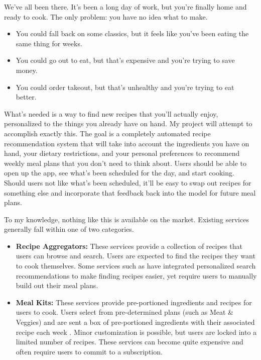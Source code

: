 \documentclass{./styles/ucsdreport}
\begin{document}
We've all been there. It's been a long day of work, but you're finally home and ready to cook. The only problem: you have no idea what to make.

\begin{itemize}
    \item You could fall back on some classics, but it feels like you've been eating the same thing for weeks.
    \item You could go out to eat, but that's expensive and you're trying to save money.
    \item You could order takeout, but that's unhealthy and you're trying to eat better.
\end{itemize}

What's needed is a way to find new recipes that you'll actually enjoy, personalized to the things you already have on hand. My project will attempt to accomplish exactly this. The goal is a completely automated recipe recommendation system that will take into account the ingredients you have on hand, your dietary restrictions, and your personal preferences to recommend weekly meal plans that you don't need to think about. Users should be able to open up the app, see what's been scheduled for the day, and start cooking. Should users not like what's been scheduled, it'll be easy to swap out recipes for something else and incorporate that feedback back into the model for future meal plans.

To my knowledge, nothing like this is available on the market. Existing services generally fall within one of two categories.

\begin{itemize}

    \item \textbf{Recipe Aggregators:} These services provide a collection of recipes that users can browse and search. Users are expected to find the recipes they want to cook themselves. Some services such as \citet{yummly} have integrated personalized search recommendations to make finding recipes easier, yet require users to manually build out their meal plans.

    \item \textbf{Meal Kits:} These services provide pre-portioned ingredients and recipes for users to cook. Users select from pre-determined plans (such as Meat \& Veggies) and are sent a box of pre-portioned ingredients with their associated recipe each week \citep{hellofresh}. Minor customization is possible, but users are locked into a limited number of recipes. These services can become quite expensive and often require users to commit to a subscription.

\end{itemize}
\end{document}
